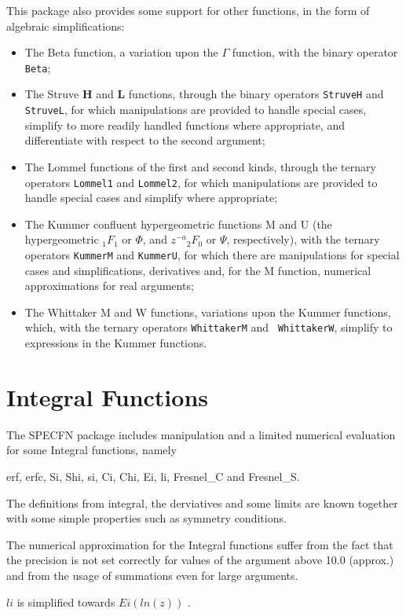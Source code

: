 \documentclass[11pt]{article}
\begin{document}
This package also provides some support for other functions, in the form
of algebraic simplifications:
\begin{itemize}
\item The Beta function, a variation upon the $\Gamma$
function\cite{Abramowitz:72}, with the binary operator {\tt Beta};
\item The Struve {\bf H} and {\bf L} functions, through the binary
operators {\tt StruveH} and {\tt StruveL}, for which manipulations are
provided to handle special cases, simplify to more readily handled
functions where appropriate, and differentiate with respect to the second
argument;
\item The Lommel functions of the first and second kinds, through the
ternary operators {\tt Lommel1} and {\tt Lommel2}, for which manipulations
are provided to handle special cases and simplify where appropriate;
\item The Kummer confluent hypergeometric functions M and U (the
hypergeometric ${_1F_1}$ or $\Phi$, and $z^{-a}{_2F_0}$ or $\Psi$,
respectively),
with the ternary operators {\tt KummerM} and {\tt KummerU}, for which
there are manipulations for special cases and simplifications, derivatives
and, for the M function, numerical approximations for real arguments;
\item The Whittaker M and W functions, variations upon the Kummer
functions, which, with the ternary operators {\tt WhittakerM} and {\tt
WhittakerW}, simplify to expressions in the Kummer functions.
\end{itemize}

\section{Integral Functions}

The SPECFN package includes manipulation and a limited numerical
evaluation for some Integral functions, namely

erf, erfc, Si, Shi, si, Ci, Chi, Ei, li,  Fresnel\_C and Fresnel\_S.

The definitions from integral, the derviatives and some limits are
known together with some simple properties such as symmetry
conditions.

The numerical approximation for the Integral functions suffer
from the fact that the precision is not set correctly for
values of the argument above 10.0 (approx.) and from the
usage of summations even for large arguments.

$li$ is simplified towards $Ei(ln(z))$ . 
\end{document}
